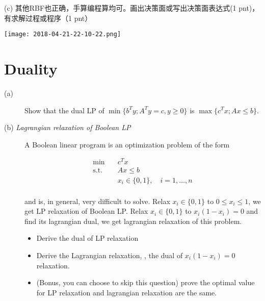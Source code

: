 \documentclass[12pt]{article}
\begin{document}
(c) 其他RBF也正确，手算编程算均可。画出决策面或写出决策面表达式(1 pnt)，有求解过程或程序（1 pnt）

\begin{center}
	\texttt{[image: 2018-04-21-22-10-22.png]}
\end{center}

\section{Duality}

\begin{description}
	\item[(a)] Show that the dual LP of \(\min\{  b^T y ; A^T y =c, y \ge 0\}\) is \(\max \{c^T x ; A x \le b\}\). 
	\item[(b) \textit{Lagrangian relaxation of Boolean LP}]  A Boolean linear program is an optimization problem of the form

	      \begin{equation}
		      \begin{aligned}
			      \min \quad          & c^T x                                  \\
			      \textrm{s.t.} \quad & Ax \le b                               \\
			                          & x_i \in \{0,1\}, \quad i= 1, \dots , n \\
		      \end{aligned}
	      \end{equation}

		  and is, in general, very difficult to solve. Relax  $x_i \in \{0,1\}$ to $0 \le x_i \le 1$, we get LP relaxation of Boolean LP. Relax $x_i \in \{0,1\}$ to $x_i(1 - x_i) = 0$ and find its lagrangian dual, we get lagrangian  relaxation of this problem. 
		  \begin{itemize}
			  \item Derive the dual of  LP relaxation 
			  \item Derive the Lagrangian relaxation, \ie, the dual of $x_i(1 - x_i) = 0$ relaxation.
			  \item (Bonus, you can choose to skip this question) prove  the optimal value for LP relaxation and lagrangian relaxation  are the same.
 		  \end{itemize}


\end{description}
\end{document}
